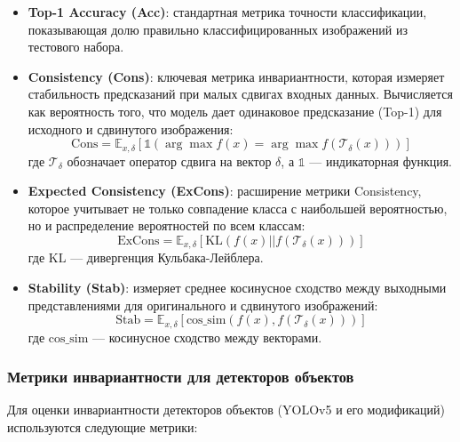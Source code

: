 \begin{itemize}
    \item \textbf{Top-1 Accuracy (Acc)}: стандартная метрика точности классификации, показывающая долю правильно классифицированных изображений из тестового набора.
    
    \item \textbf{Consistency (Cons)}: ключевая метрика инвариантности, которая измеряет стабильность предсказаний при малых сдвигах входных данных. Вычисляется как вероятность того, что модель дает одинаковое предсказание (Top-1) для исходного и сдвинутого изображения:
    \begin{equation}
    \text{Cons} = \mathbb{E}_{x, \delta} [\mathbb{1}(\arg\max f(x) = \arg\max f(\mathcal{T}_\delta(x)))]
    \end{equation}
    где $\mathcal{T}_\delta$ обозначает оператор сдвига на вектор $\delta$, а $\mathbb{1}$ — индикаторная функция.
    
    \item \textbf{Expected Consistency (ExCons)}: расширение метрики Consistency, которое учитывает не только совпадение класса с наибольшей вероятностью, но и распределение вероятностей по всем классам:
    \begin{equation}
    \text{ExCons} = \mathbb{E}_{x, \delta} [\text{KL}(f(x) || f(\mathcal{T}_\delta(x)))]
    \end{equation}
    где $\text{KL}$ — дивергенция Кульбака-Лейблера.
    
    \item \textbf{Stability (Stab)}: измеряет среднее косинусное сходство между выходными представлениями для оригинального и сдвинутого изображений:
    \begin{equation}
    \text{Stab} = \mathbb{E}_{x, \delta} [\text{cos\_sim}(f(x), f(\mathcal{T}_\delta(x)))]
    \end{equation}
    где $\text{cos\_sim}$ — косинусное сходство между векторами.
\end{itemize}

\subsubsection{Метрики инвариантности для детекторов объектов}
\label{sec:evaluation:detection}

Для оценки инвариантности детекторов объектов (YOLOv5 и его модификаций) используются следующие метрики:

